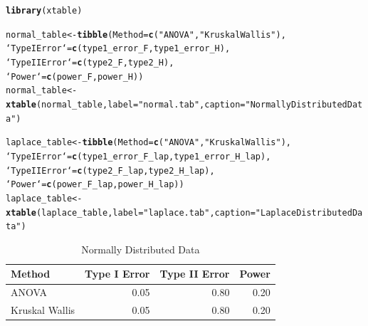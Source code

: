 \documentclass{article}\usepackage[]{graphicx}\usepackage[]{xcolor}
\makeatletter
\newcommand{\hlsng}[1]{\textcolor[rgb]{0.192,0.494,0.8}{#1}}%
\newcommand{\hldef}[1]{\textcolor[rgb]{0.345,0.345,0.345}{#1}}%
\newcommand{\hlkwb}[1]{\textcolor[rgb]{0.69,0.353,0.396}{#1}}%
\newcommand{\hlkwc}[1]{\textcolor[rgb]{0.333,0.667,0.333}{#1}}%
\newcommand{\hlkwd}[1]{\textcolor[rgb]{0.737,0.353,0.396}{\textbf{#1}}}%
\newenvironment{kframe}{%
 \def\at@end@of@kframe{}%
 \ifinner\ifhmode%
  \def\at@end@of@kframe{\end{minipage}}%
  \begin{minipage}{\columnwidth}%
 \fi\fi%
 \def\FrameCommand##1{\hskip\@totalleftmargin \hskip-\fboxsep
 \colorbox{shadecolor}{##1}\hskip-\fboxsep
     \hskip-\linewidth \hskip-\@totalleftmargin \hskip\columnwidth}%
 \MakeFramed {\advance\hsize-\width
   \@totalleftmargin\z@ \linewidth\hsize
   \@setminipage}}%
 {\par\unskip\endMakeFramed%
 \at@end@of@kframe}
\newenvironment{knitrout}{}{} %
\makeatother
\begin{document}
\begin{enumerate}
\begin{enumerate}
\begin{knitrout}\scriptsize
{}\color{fgcolor}\begin{kframe}
\begin{alltt}
\hlkwd{library}\hldef{(xtable)}

\hldef{normal_table} \hlkwb{<-} \hlkwd{tibble}\hldef{(}\hlkwc{Method} \hldef{=} \hlkwd{c}\hldef{(}\hlsng{"ANOVA"}\hldef{,} \hlsng{"Kruskal Wallis"}\hldef{),}
                       \hlkwc{`Type I Error`} \hldef{=} \hlkwd{c}\hldef{(type1_error_F, type1_error_H),}
                       \hlkwc{`Type II Error`}\hldef{=} \hlkwd{c}\hldef{(type2_F, type2_H),}
                       \hlkwc{`Power`} \hldef{=} \hlkwd{c}\hldef{(power_F, power_H))}
\hldef{normal_table} \hlkwb{<-} \hlkwd{xtable}\hldef{(normal_table,}\hlkwc{label} \hldef{=} \hlsng{"normal.tab"}\hldef{,} \hlkwc{caption} \hldef{=} \hlsng{"Normally Distributed Data"}\hldef{)}

\hldef{laplace_table} \hlkwb{<-} \hlkwd{tibble}\hldef{(}\hlkwc{Method} \hldef{=} \hlkwd{c}\hldef{(}\hlsng{"ANOVA"}\hldef{,} \hlsng{"Kruskal Wallis"}\hldef{),}
                        \hlkwc{`Type I Error`} \hldef{=} \hlkwd{c}\hldef{(type1_error_F_lap, type1_error_H_lap),}
                       \hlkwc{`Type II Error`}\hldef{=} \hlkwd{c}\hldef{(type2_F_lap, type2_H_lap),}
                       \hlkwc{`Power`} \hldef{=} \hlkwd{c}\hldef{(power_F_lap, power_H_lap))}
\hldef{laplace_table} \hlkwb{<-} \hlkwd{xtable}\hldef{(laplace_table,}\hlkwc{label} \hldef{=} \hlsng{"laplace.tab"}\hldef{,} \hlkwc{caption} \hldef{=} \hlsng{"Laplace Distributed Data"}\hldef{)}
\end{alltt}
\end{kframe}
\end{knitrout}


\begin{table}[H]
\centering
\begingroup\small
\begin{tabular}{lrrr}
  \hline
Method & Type I Error & Type II Error & Power \\ 
  \hline
ANOVA & 0.05 & 0.80 & 0.20 \\ 
  Kruskal Wallis & 0.05 & 0.80 & 0.20 \\ 
   \hline
\end{tabular}
\endgroup
\caption{Normally Distributed Data} 
\label{normal.tab}
\end{table}




\end{enumerate}
\end{enumerate}
\end{document}

